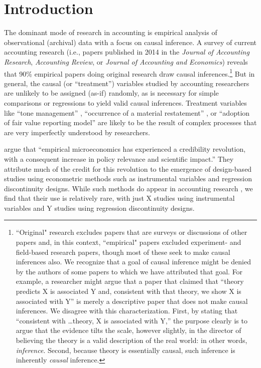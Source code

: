 \section{Introduction}

The dominant mode of research in accounting is empirical analysis of observational (archival) data with a focus on causal inference. A survey of current accounting research (i.e., papers published in 2014 in the \textit{Journal of Accounting Research}, \textit{Accounting Review}, or \textit{Journal of Accounting and Economics}) reveals that 90\% empirical papers doing original research draw causal inferences.\footnote{``Original" research excludes papers that are surveys or discussions of other papers and, in this context, ``empirical" papers excluded experiment- and field-based research papers, though most of these seek to make causal inferences also.  We recognize that a goal of causal inference might be denied by the authors of some papers to which we have attributed that goal. 
For example, a researcher might argue that a paper that claimed that ``theory predicts X is associated Y and, consistent with that theory, we show X is associated with Y'' is merely a descriptive paper that does not make causal inferences. 
We disagree with this characterization. 
First, by stating that ``consistent with \dots theory, X is associated with Y,'' the purpose clearly is to argue that the evidence tilts the scale, however slightly, in the director of believing the theory is a valid description of the real world: in other words, \emph{inference}. 
Second, because theory is essentially causal, such inference is inherently \emph{causal} inference.} 
But in general, the causal (or ``treatment'') variables studied by accounting researchers are unlikely to be assigned (as-if) randomly, as is necessary for simple comparisons or regressions to yield valid causal inferences. Treatment variables like ``tone management'' \citep{Huang:2014cs}, ``occurrence of a material restatement'' \citep{Chen:2014ji}, or ``adoption of fair value reporting model'' \citep{Liang:2014ea} are likely to be the result of complex processes that are very imperfectly understood by researchers.

\cite{Angrist:2010jv} argue that ``empirical microeconomics has experienced a credibility revolution, with a consequent increase in policy relevance and scientific impact.'' They attribute much of the credit for this revolution to the emergence of design-based studies using econometric methods such as instrumental variables and regression discontinuity designs. While such methods do appear in accounting research \citep{Larcker:2010fq}, we find that their use is relatively rare, with just X studies using instrumental variables and Y studies using regression discontinuity designs.


